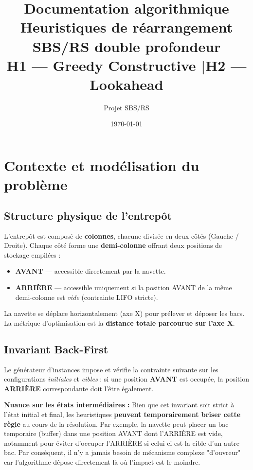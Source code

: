 \documentclass[12pt,a4paper]{article}
\title{\textbf{Documentation algorithmique}\\[4pt]
       \large Heuristiques de réarrangement SBS/RS double profondeur\\
       H1 — Greedy Constructive \quad|\quad H2 — Lookahead}
\author{Projet SBS/RS}
\date{\today}
\begin{document}
\maketitle
\tableofcontents
\newpage

\section{Contexte et modélisation du problème}

\subsection{Structure physique de l'entrepôt}

L'entrepôt est composé de \textbf{colonnes}, chacune divisée en deux côtés
(Gauche / Droite). Chaque côté forme une \textbf{demi-colonne} offrant
deux positions de stockage empilées :

\begin{itemize}[noitemsep]
  \item \textbf{AVANT} — accessible directement par la navette.
  \item \textbf{ARRIÈRE} — accessible uniquement si la position AVANT
        de la même demi-colonne est \emph{vide} (contrainte LIFO stricte).
\end{itemize}

La navette se déplace horizontalement (axe X) pour prélever et déposer
les bacs. La métrique d'optimisation est la \textbf{distance totale
parcourue sur l'axe X}.

\subsection{Invariant Back-First}

Le générateur d'instances impose et vérifie la contrainte suivante
sur les configurations \emph{initiales} et \emph{cibles} :
si une position \textbf{AVANT} est occupée, la position \textbf{ARRIÈRE} correspondante doit l'être également.

\textbf{Nuance sur les états intermédiaires :} Bien que cet invariant soit strict à l'état initial et final, les heuristiques \textbf{peuvent temporairement briser cette règle} au cours de la résolution. Par exemple, la navette peut placer un bac temporaire (buffer) dans une position AVANT dont l'ARRIÈRE est vide, notamment pour éviter d'occuper l'ARRIÈRE si celui-ci est la cible d'un autre bac. Par conséquent, il n'y a jamais besoin de mécanisme complexe "d'ouvreur" car l'algorithme dépose directement là où l'impact est le moindre.
\end{document}
